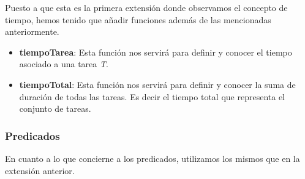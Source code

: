 \documentclass[11pt]{article}
\begin{document}
Puesto a que esta es la primera extensión donde observamos el concepto de tiempo, hemos tenido que añadir funciones además de las mencionadas anteriormente. 
\begin{itemize}

\item \textbf{tiempoTarea}: Esta función nos servirá para definir y conocer el tiempo asociado a una tarea \textit{T}.
\item \textbf{tiempoTotal}: Esta función nos servirá para definir y conocer la suma de duración de todas las tareas. Es decir el tiempo total que representa el conjunto de tareas. 

\end{itemize}
\subsubsection{Predicados}
En cuanto a lo que concierne a los predicados, utilizamos los mismos que en la extensión anterior.
\end{document}

